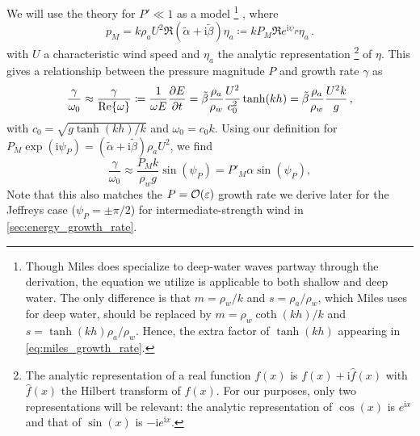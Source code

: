 \documentclass{jfm}
\newcommand{\im}{\mathrm{i}}
\renewcommand*{\epsilon}{\varepsilon}
\begin{document}
We will use the \citet{miles1957generation} theory for $P' \ll 1$ as a model%
\footnote{
  Though Miles does specialize to deep-water waves partway through the
  derivation, the equation we utilize is applicable to both shallow and
  deep water.
  The only difference is that $m = \rho_w/k$ and $s=\rho_a/\rho_w$,
  which Miles uses for deep water, should be replaced by
  $m=\rho_w\coth(kh)/k$ and $s = \tanh(kh) \rho_a/\rho_w$.
  Hence, the extra factor of $\tanh(kh)$ appearing in
  \cref{eq:miles_growth_rate}.
}%
, where
\begin{equation}
  p_M = k \rho_a U^2 \Re{(\tilde{\alpha} + \im \tilde{\beta}) \eta_a}
  \coloneqq k P_M \Re{ e^{\im \psi_P} \eta_a} \,.
\end{equation}
with $U$ a characteristic wind speed and $\eta_a$ the analytic
representation%
\footnote{
  The analytic representation of a real function $f(x)$ is $f(x) + \im
  \hat{f}(x)$ with $\hat{f}(x)$ the Hilbert transform of $f(x)$.
  For our purposes, only two representations will be relevant: the
  analytic representation of $\cos(x)$ is $e^{\im x}$ and that of
  $\sin(x)$ is $-\im e^{\im x}$.
}
of $\eta$.
This gives a relationship between the pressure magnitude $P$ and growth
rate $\gamma$ as
\begin{equation}
  \frac{\gamma}{\omega_0} \approx \frac{\gamma}{\Re{\omega}} \coloneqq
  \frac{1}{\omega E} \pdv{E}{t}
  = \tilde{\beta} \frac{\rho_a}{\rho_w} \frac{U^2}{c_0^2} \tanh(kh)
  = \tilde{\beta} \frac{\rho_a}{\rho_w} \frac{U^2 k}{g} \,,
  \label{eq:miles_growth_rate}
\end{equation}
with $c_0 = \sqrt{g\tanh(kh)/k}$ and $\omega_0 = c_0 k$.
Using our definition for $P_M \exp(\im \psi_P) = (\tilde{\alpha} + \im
\tilde{\beta}) \rho_a U^2$, we find
\begin{equation}
  \frac{\gamma}{\omega_0} \approx \frac{P_M k}{\rho_w g} \sin(\psi_P)
  = P'_M \alpha \sin(\psi_P)
  ,
\end{equation}
Note that this also matches the $P = \order{\epsilon}$ growth rate we
derive later for the Jeffreys case (\ie $\psi_P = \pm \pi/2$) for
intermediate-strength wind in \cref{sec:energy_growth_rate}.
\end{document}
